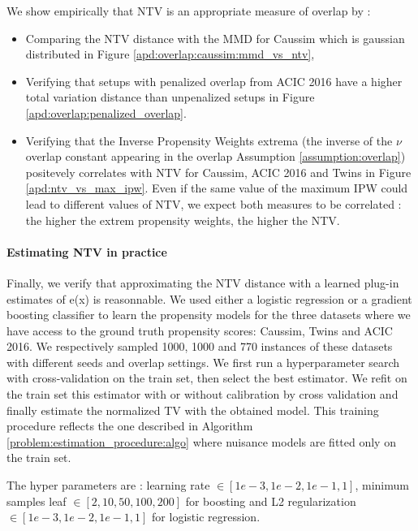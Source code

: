 \documentclass[french,12pt,twoside,a4paper]{book}
\begin{document}
\begin{appendices}
  We show empirically that NTV is an appropriate measure of overlap by :
  \begin{itemize}
    \item Comparing the NTV distance with the MMD for Caussim which is gaussian
          distributed in Figure \ref{apd:overlap:caussim:mmd_vs_ntv},
    \item Verifying that setups with penalized overlap from ACIC 2016 have a
          higher total variation distance than unpenalized setups in Figure
          \ref{apd:overlap:penalized_overlap}.
    \item Verifying that the Inverse Propensity Weights extrema (the inverse of
          the $\nu$ overlap constant appearing in the overlap Assumption
          \ref{assumption:overlap}) positevely correlates with NTV for Caussim,
          ACIC 2016 and Twins in Figure \ref{apd:ntv_vs_max_ipw}. Even if the same
          value of the maximum IPW could lead to different values of NTV, we
          expect both measures to be correlated : the higher the extrem propensity
          weights, the higher the NTV.
  \end{itemize}


  \paragraph{Estimating NTV in practice}

  Finally, we verify that approximating the NTV distance with a learned plug-in
  estimates of e(x) is reasonnable. We used either a logistic regression or a
  gradient boosting classifier to learn the propensity models for the three
  datasets where we have access to the ground truth propensity scores: Caussim,
  Twins and ACIC 2016. We respectively sampled 1000, 1000 and 770 instances of
  these datasets with different seeds and overlap settings. We first run a
  hyperparameter search with cross-validation on the train set, then select the
  best estimator. We refit on the train set this estimator with or without
  calibration by cross validation and finally estimate the normalized TV with the
  obtained model. This training procedure reflects the one described in Algorithm
  \ref{problem:estimation_procedure:algo} where nuisance models are fitted only on
  the train set.

  The hyper parameters are : learning rate $ \in [1e-3, 1e-2, 1e-1, 1]$, minimum
  samples leaf $\in [2, 10, 50, 100, 200]$ for boosting and L2 regularization $\in
    [1e-3, 1e-2, 1e-1, 1]$ for logistic regression.


\end{appendices}
\end{document}
